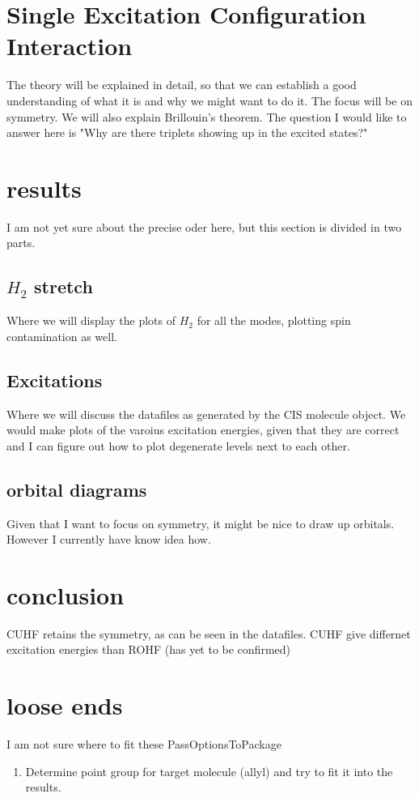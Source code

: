 \section{Single Excitation Configuration Interaction}
The theory will be explained in detail, so that we can establish a good understanding of what it is and why we might want to do it. The focus will be on symmetry.
We will also explain Brillouin's theorem. The question I would like to answer here is "Why are there triplets showing up in the excited states?"

\section{results}
I am not yet sure about the precise oder here, but this section is divided in two parts.

\subsection{$H_2$ stretch}
Where we will display the plots of $H_2$ for all the modes, plotting spin contamination as well.

\subsection{Excitations}
Where we will discuss the datafiles as generated by the CIS molecule object. We would make plots of the varoius excitation energies, given that they are correct and
I can figure out how to plot degenerate levels next to each other.

\subsection{orbital diagrams}
Given that I want to focus on symmetry, it might be nice to draw up orbitals. However I currently have know idea how.

\section{conclusion}
CUHF retains the symmetry, as can be seen in the datafiles. 
CUHF give differnet excitation energies than ROHF (has yet to be confirmed)

\section{loose ends}
I am not sure where to fit these PassOptionsToPackage
\begin{enumerate}
    \item Determine point group for target molecule (allyl) and try to fit it into the results.
\end{enumerate}

